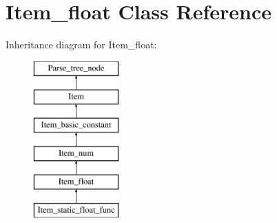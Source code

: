 \hypertarget{classItem__float}{}\section{Item\+\_\+float Class Reference}
\label{classItem__float}
Inheritance diagram for Item\+\_\+float\+:\begin{figure}[H]
\begin{center}
\leavevmode
\includegraphics[height=6.000000cm]{classItem__float}
\end{center}
\end{figure}
